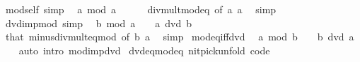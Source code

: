 \begin{isabellebody}
\isamarkupfalse%
%
\endisatagproof
{\isafoldproof}%
%
\isadelimproof
\isanewline
%
\endisadelimproof
\isanewline
{}\isamarkupfalse%
\ mod{\isacharunderscore}{\kern0pt}self\ {\isacharbrackleft}{\kern0pt}simp{\isacharbrackright}{\kern0pt}{\isacharcolon}{\kern0pt}\isanewline
\ \ {\isachardoublequoteopen}a\ mod\ a\ {\isacharequal}{\kern0pt}\ {}{\isachardoublequoteclose}\isanewline
%
\isadelimproof
\ \ %
\endisadelimproof
%
\isatagproof
{}\isamarkupfalse%
\ div{\isacharunderscore}{\kern0pt}mult{\isacharunderscore}{\kern0pt}mod{\isacharunderscore}{\kern0pt}eq\ {\isacharbrackleft}{\kern0pt}of\ a\ a{\isacharbrackright}{\kern0pt}\ \isamarkupfalse%
\ simp%
\endisatagproof
{\isafoldproof}%
%
\isadelimproof
\isanewline
%
\endisadelimproof
\isanewline
{}\isamarkupfalse%
\ dvd{\isacharunderscore}{\kern0pt}imp{\isacharunderscore}{\kern0pt}mod{\isacharunderscore}{\kern0pt}{}\ {\isacharbrackleft}{\kern0pt}simp{\isacharbrackright}{\kern0pt}{\isacharcolon}{\kern0pt}\isanewline
\ \ {\isachardoublequoteopen}b\ mod\ a\ {\isacharequal}{\kern0pt}\ {}{\isachardoublequoteclose}\ \ {\isachardoublequoteopen}a\ dvd\ b{\isachardoublequoteclose}\isanewline
%
\isadelimproof
\ \ %
\endisadelimproof
%
\isatagproof
{}\isamarkupfalse%
\ that\ minus{\isacharunderscore}{\kern0pt}div{\isacharunderscore}{\kern0pt}mult{\isacharunderscore}{\kern0pt}eq{\isacharunderscore}{\kern0pt}mod\ {\isacharbrackleft}{\kern0pt}of\ b\ a{\isacharbrackright}{\kern0pt}\ \isamarkupfalse%
\ simp%
\endisatagproof
{\isafoldproof}%
%
\isadelimproof
\isanewline
%
\endisadelimproof
\isanewline
{}\isamarkupfalse%
\ mod{\isacharunderscore}{\kern0pt}eq{\isacharunderscore}{\kern0pt}{}{\isacharunderscore}{\kern0pt}iff{\isacharunderscore}{\kern0pt}dvd{\isacharcolon}{\kern0pt}\isanewline
\ \ {\isachardoublequoteopen}a\ mod\ b\ {\isacharequal}{\kern0pt}\ {}\ {\isasymlongleftrightarrow}\ b\ dvd\ a{\isachardoublequoteclose}\isanewline
%
\isadelimproof
\ \ %
\endisadelimproof
%
\isatagproof
{}\isamarkupfalse%
\ {\isacharparenleft}{\kern0pt}auto\ intro{\isacharcolon}{\kern0pt}\ mod{\isacharunderscore}{\kern0pt}{}{\isacharunderscore}{\kern0pt}imp{\isacharunderscore}{\kern0pt}dvd{\isacharparenright}{\kern0pt}%
\endisatagproof
{\isafoldproof}%
%
\isadelimproof
\isanewline
%
\endisadelimproof
\isanewline
{}\isamarkupfalse%
\ dvd{\isacharunderscore}{\kern0pt}eq{\isacharunderscore}{\kern0pt}mod{\isacharunderscore}{\kern0pt}eq{\isacharunderscore}{\kern0pt}{}\ {\isacharbrackleft}{\kern0pt}nitpick{\isacharunderscore}{\kern0pt}unfold{\isacharcomma}{\kern0pt}\ code{\isacharbrackright}{\kern0pt}{\isacharcolon}{\kern0pt}\isanewline

\end{isabellebody}

